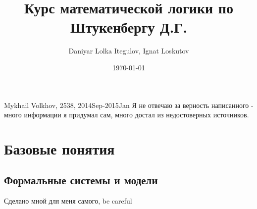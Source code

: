 \documentclass[12pt]{article}
\author{Daniyar Lolka Itegulov, Ignat Loskutov}
\date{\today}
\title{Курс математической логики по Штукенбергу Д.Г.}
\begin{document}
\theoremstyle{definition}
\newtheorem{definition}{Определение}[section]
\newtheorem*{example}{Пример}
\newtheorem{theorem}{Теорема}[section]
\newtheorem{axiom}{Аксиома}[section]
\newtheorem{lemma}[theorem]{Лемма}

\newcommand{\s}[1]{\texttt{#1}}
\newcommand{\xl}{$\lambda$}
\newcommand{\+}{\lambda}
\newcommand{\bredmath}{\ \longrightarrow_\beta\ }
\newcommand{\bred}{$\bredmath$}
\newcommand{\mbred}{$\ \longrightarrow\!\!\!\!\rightarrow_\beta\ $}
\newcommand{\lid}[1]{\textit{#1}}
\newcommand{\concat}{\hat{\ \ }}

\def\ra{\rightarrow}

\def\from#1{\par \parbox{0.7\textwidth}{\par \hfill\raggedleft \it #1}} 

\newenvironment{epigraph}%
{\begin{list}{}{\setlength{\leftmargin}{0.3\textwidth}}\item[]}%
{\end{list}} 

\maketitle
\tableofcontents


Mykhail Volkhov, 2538, 2014Sep-2015Jan
Я не отвечаю за верность написанного - много информации
я придумал сам, много достал из недостоверных источников.

\section{Базовые понятия}
\label{sec-1}
\subsection{Формальные системы и модели}
\label{sec-1-1}
Сделано мной для меня самого, be careful
\end{document}
